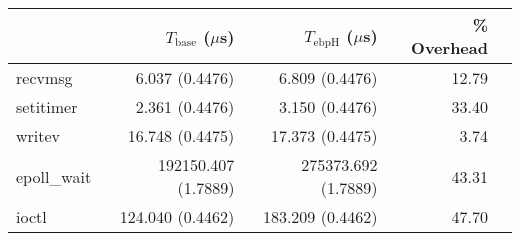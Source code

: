 \begin{tabular}{>{\ttfamily}lrrrr}
\toprule
\multicolumn{1}{l}{System Call} & $T_{\text{base}}$ ($\mu$s) & $T_{\text{ebpH}}$ ($\mu$s) &  \% Overhead \\
\midrule
                        recvmsg &             6.037 (0.4476) &             6.809 (0.4476) &        12.79 \\
                      setitimer &             2.361 (0.4476) &             3.150 (0.4476) &        33.40 \\
                         writev &            16.748 (0.4475) &            17.373 (0.4475) &         3.74 \\
                    epoll\_wait &        192150.407 (1.7889) &        275373.692 (1.7889) &        43.31 \\
                          ioctl &           124.040 (0.4462) &           183.209 (0.4462) &        47.70 \\
\bottomrule
\end{tabular}
